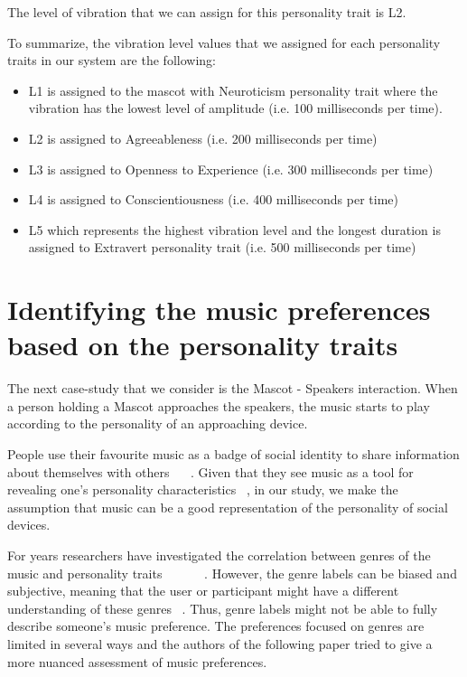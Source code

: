 The level of vibration that we can assign for this personality trait is L2.

\par To summarize, the vibration level values that we assigned for each personality traits in our system are the following:
\begin{itemize}
\item L1 is assigned to the mascot with Neuroticism personality trait where the vibration has the lowest level of amplitude (i.e. 100 milliseconds per time).
\item L2 is assigned to Agreeableness (i.e. 200 milliseconds per time)
\item L3 is assigned to Openness to Experience (i.e. 300 milliseconds per time)
\item L4 is assigned to Conscientiousness (i.e. 400 milliseconds per time)
\item L5 which represents the highest vibration level and the longest duration is assigned to Extravert personality trait (i.e. 500 milliseconds per time)
\end{itemize}



\section{Identifying the music preferences based on the personality traits}
\label{sec:Identifying the music preferences based on the personality traits}

\par The next case-study that we consider is the Mascot - Speakers interaction. When a person holding a Mascot approaches the speakers, the music starts to play according to the personality of an approaching device. 

\par People use their favourite music as a badge of social identity to share information about themselves with others ~\cite{boer2011shared} ~\cite{rentfrow2007content}. Given that they see music as a tool for revealing one’s personality characteristics ~\cite{rentfrow2006message}, in our study, we make the assumption that music can be a good representation of the personality of social devices. 

\par For years researchers have investigated the correlation between genres of the music and personality traits ~\cite{schafer2009functions} ~\cite{george2007association} ~\cite{zweigenhaft2008re} ~\cite{dunn2012toward}. However, the genre labels can be biased and subjective, meaning that the user or participant might have a different understanding of these genres ~\cite{rentfrow2011structure}. Thus, genre labels might not be able to fully describe someone’s music preference. The preferences focused on genres are limited in several ways and the authors of the following paper tried to give a more nuanced assessment of music preferences.

